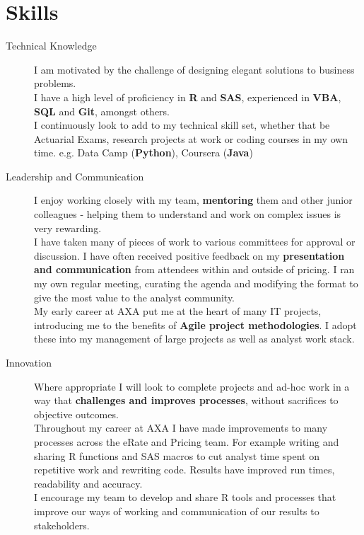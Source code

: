 \documentclass[11pt]{article}
\begin{document}
\section*{Skills}
\begin{description}

\item[Technical Knowledge] I am motivated by the challenge of designing elegant solutions to business problems. \\
I have a high level of proficiency in \textbf{R} and \textbf{SAS}, experienced in \textbf{VBA}, \textbf{SQL} and \textbf{Git}, amongst others.\\
I continuously look to add to my technical skill set, whether that be Actuarial Exams, research projects at work or coding courses in my own time. e.g. Data Camp (\textbf{Python}), Coursera (\textbf{Java})

\item[Leadership and Communication] I enjoy working closely with my team, \textbf{mentoring} them and other junior colleagues - helping them to understand and work on complex issues is very rewarding. \\
I have taken many of pieces of work to various committees for approval or discussion. I have often received positive feedback on my \textbf{presentation and communication} from attendees within and outside of pricing. I ran my own regular meeting, curating the agenda and modifying the format to give the most value to the analyst community.\\
My early career at AXA put me at the heart of many IT projects, introducing me to the benefits of \textbf{Agile project methodologies}. I adopt these into my management of large projects as well as analyst work stack.

\item[Innovation] Where appropriate I will look to complete projects and ad-hoc work in a way that \textbf{challenges and improves processes}, without sacrifices to objective outcomes.\\
Throughout my career at AXA I have made improvements to many processes across the eRate and Pricing team. For example writing and sharing R functions and SAS macros to cut analyst time spent on repetitive work and rewriting code. Results have improved run times, readability and accuracy.\\
I encourage my team to develop and share R tools and processes that improve our ways of working and communication of our results to stakeholders.

\end{description} 
\end{document}
